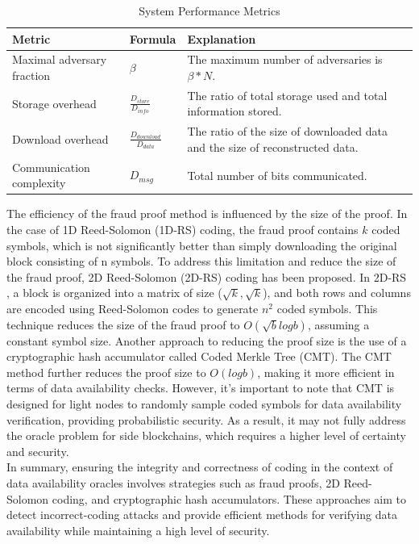\documentclass{report}
\begin{document}
\begin{table}[htbp]
	\centering
	\captionsetup{justification=centering}
	\caption[position=above]{System Performance Metrics}
	\begin{tabular}{|>{\centering\arraybackslash}p{4cm}|>{\centering\arraybackslash}p{4cm}|>{\centering\arraybackslash}p{4cm}|}
		\hline
		\textbf{Metric} & \textbf{Formula} & \textbf{Explanation}\\
		\hline
		Maximal adversary fraction & $\beta$ & The maximum number of adversaries is $\beta * N$. \\
		\hline
		Storage overhead & $\frac{D_{store}}{D_{info}}$ & The ratio of total storage used and total information stored.\\
		\hline
		Download overhead & $\frac{D_{download}}{D_{data}}$ & The ratio of the size of downloaded data and the size of reconstructed data. \\
		\hline
		Communication complexity & $D_{msg}$ & Total number of bits communicated.\\
		\hline
	\end{tabular}
\end{table}
The efficiency of the fraud proof method is influenced by the size of the proof. In the case of 1D Reed-Solomon (1D-RS) coding, the fraud proof contains $k$ coded symbols, which is not significantly better than simply downloading the original block consisting of n symbols. To address this limitation and reduce the size of the fraud proof, 2D Reed-Solomon (2D-RS) coding has been proposed. In 2D-RS \cite{reference1}, a block is organized into a matrix of size ($\sqrt{k}, \sqrt{k}$), and both rows and columns are encoded using Reed-Solomon codes to generate $n^{2}$ coded symbols. This technique reduces the size of the fraud proof to $O(\sqrt{b}logb)$, assuming a constant symbol size.
Another approach to reducing the proof size is the use of a cryptographic hash accumulator called Coded Merkle Tree (CMT)\cite{reference4}. The CMT method further reduces the proof size to $O(logb)$, making it more efficient in terms of data availability checks. However, it's important to note that CMT is designed for light nodes to randomly sample coded symbols for data availability verification, providing probabilistic security. As a result, it may not fully address the oracle problem for side blockchains, which requires a higher level of certainty and security.\\
In summary, ensuring the integrity and correctness of coding in the context of data availability oracles involves strategies such as fraud proofs, 2D Reed-Solomon coding, and cryptographic hash accumulators. These approaches aim to detect incorrect-coding attacks and provide efficient methods for verifying data availability while maintaining a high level of security.
\end{document}
